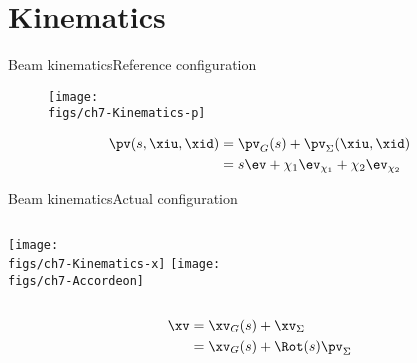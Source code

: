 \section{Kinematics}

\begin{frame}{Beam kinematics}{Reference configuration}

\begin{figure}
\centering\texttt{[image: \\figs/ch7-Kinematics-p]}
\end{figure}

\begin{displaymath}
\begin{split}
\pv(s,\xiu,\xid) &=\pv_G(s)+\pv_\Sigma(\xiu,\xid) \\
&= s\ev+\chi_1\ev_{\chi_1}+\chi_2\ev_{\chi_2}
\end{split}
\end{displaymath}

\end{frame}

\begin{frame}{Beam kinematics}{Actual configuration}

\vskip-10pt
\begin{columns}
\centering\texttt{[image: \\figs/ch7-Kinematics-x]}
\centering\texttt{[image: \\figs/ch7-Accordeon]}
\end{columns}

\begin{displaymath}
\begin{split}
\xv &=\xv_G(s)+\xv_\Sigma \\
&= \xv_G(s)+\Rot(s)\pv_\Sigma
\end{split}
\end{displaymath}

\end{frame}

